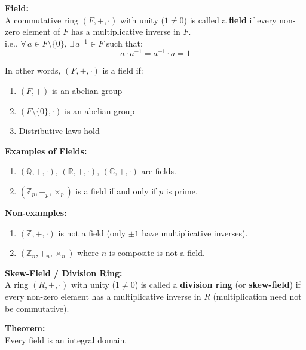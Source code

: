 \documentclass[11pt]{article}
\begin{document}
\noindent \textbf{Field:} \\
A commutative ring $(F, +, \cdot)$ with unity ($1 \ne 0$) is called a \textbf{field} if every non-zero element of $F$ has a multiplicative inverse in $F$. \\
i.e., $\forall\, a \in F \setminus \{0\}$, $\exists\, a^{-1} \in F$ such that:
\[
a \cdot a^{-1} = a^{-1} \cdot a = 1
\]

\bigskip
\noindent In other words, $(F, +, \cdot)$ is a field if:
\begin{enumerate}
    \item $(F, +)$ is an abelian group
    \item $(F \setminus \{0\}, \cdot)$ is an abelian group
    \item Distributive laws hold
\end{enumerate}

\bigskip
\noindent \textbf{Examples of Fields:}
\begin{enumerate}
    \item $(\mathbb{Q}, +, \cdot)$, $(\mathbb{R}, +, \cdot)$, $(\mathbb{C}, +, \cdot)$ are fields.
    \item $(\mathbb{Z}_p, +_p, \times_p)$ is a field if and only if $p$ is prime.
\end{enumerate}

\bigskip
\noindent \textbf{Non-examples:}
\begin{enumerate}
    \item $(\mathbb{Z}, +, \cdot)$ is not a field (only $\pm 1$ have multiplicative inverses).
    \item $(\mathbb{Z}_n, +_n, \times_n)$ where $n$ is composite is not a field.
\end{enumerate}

\bigskip
\noindent \textbf{Skew-Field / Division Ring:} \\
A ring $(R, +, \cdot)$ with unity ($1 \ne 0$) is called a \textbf{division ring} (or \textbf{skew-field}) if every non-zero element has a multiplicative inverse in $R$ (multiplication need not be commutative).

\bigskip
\noindent \textbf{Theorem:} \\
Every field is an integral domain.
\end{document}
